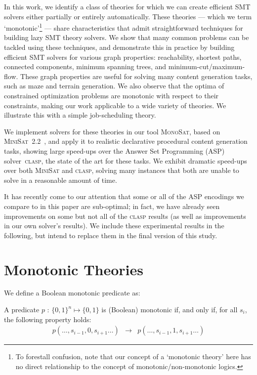 \documentclass[runningheads]{llncs}
\newcommand{\algformat}[1]{\textsc{#1}\xspace}
\newcommand{\minisat}{\algformat{MiniSat}}
\newcommand{\monosat}{\algformat{MonoSat}}
\newcommand{\clasp}{\algformat{clasp}}
\begin{document}
In this work,  we identify a class of theories for which we can create
efficient SMT solvers either partially or entirely automatically. These
theories --- which we term `monotonic'\footnote{To forestall confusion,
note that our concept of a `monotonic theory' here has no direct
relationship to the concept of monotonic/non-monotonic logics.} ---
share
characteristics that admit straightforward techniques
for building lazy SMT theory solvers.
We show that many common problems
can be tackled using these techniques, and demonstrate this in practice
by building efficient SMT solvers for various graph properties:
reachability, shortest paths, connected components, minimum spanning
trees, and minimum-cut/maximum-flow. These graph properties are useful
for solving many content generation tasks, such as maze and
terrain generation.
We also observe that the optima of constrained optimization problems
are monotonic with respect to their constraints, making our work
applicable to a wide variety of theories.
We illustrate this with a simple job-scheduling theory.

We implement solvers for these theories in our tool \monosat,
based on \minisat~2.2~\cite{een2004extensible}, and apply it
to realistic declarative procedural content generation tasks,
showing large speed-ups over the Answer Set Programming (ASP)
solver~\clasp\cite{gebser2007clasp}, the state of the art for these tasks. We
exhibit dramatic speed-ups over both \minisat and \clasp, solving many instances that both are unable to solve
in a reasonable amount of time. 

It has recently come to our attention that some or all of the ASP encodings we compare to 
in this paper are sub-optimal; in fact, we have already seen improvements on some but not all of the \clasp results (as well as improvements in our own solver's results). We include these experimental results in the following, but intend to replace them in the final version 
of this study.


\section{Monotonic Theories\label{sec:smmt}}



We define a Boolean monotonic predicate as:

\begin{definition}
A predicate $p$ : $\{0,1\}^n \mapsto \{0,1\}$ is (Boolean) monotonic if, and only if,  for all $s_i$, the following property holds:
\begin{eqnarray}
\label{condition:predicate}   p(\ldots, s_{i-1}, 0, s_{i+1} \ldots) & \rightarrow & p(\ldots, s_{i-1}, 1, s_{i+1} \ldots) 
\end{eqnarray}
\end{definition}
\end{document}
